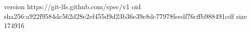 version https://git-lfs.github.com/spec/v1
oid sha256:a922f9584dc562d28e2ef455d9d23b36e39e8dc77978feedf76cffb988491cdf
size 174916
